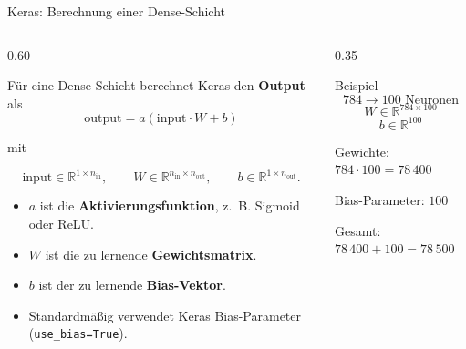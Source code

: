 \begin{frame}{Keras: Berechnung einer Dense-Schicht}
\footnotesize
\begin{columns}
\begin{column}{0.60\textwidth}

Für eine Dense-Schicht berechnet Keras den \textbf{Output} als
\[
\boxed{
\text{output} = a(\text{input}\cdot W + b)
}
\]

mit

\[
\text{input} \in \mathbb{R}^{1 \times n_{\text{in}}},
\qquad
W \in \mathbb{R}^{n_{\text{in}} \times n_{\text{out}}},
\qquad
b \in \mathbb{R}^{1 \times n_{\text{out}}}.
\]

\begin{itemize}
\item $a$ ist die \textbf{Aktivierungsfunktion}, z.~B. Sigmoid oder ReLU.
\item $W$ ist die zu lernende \textbf{Gewichtsmatrix}.
\item $b$ ist der zu lernende \textbf{Bias-Vektor}.
\item Standardmäßig verwendet Keras Bias-Parameter
(\texttt{use\_bias=True}).
\end{itemize}

\end{column}
\begin{column}{0.35\textwidth}

\begin{blockC3}{\footnotesize Beispiel}
\[
784 \rightarrow 100 \text{ Neuronen}
\]
\[
W \in \mathbb{R}^{784 \times 100}
\]
\[
b \in \mathbb{R}^{100}
\]
\par \bigskip
Gewichte: $784 \cdot 100 = 78\,400$\par \medskip

Bias-Parameter: $100$\par \medskip

Gesamt: $78\,400 + 100 = 78\,500$\par \medskip

\end{blockC3}
\end{column}
\end{columns}
\end{frame}

